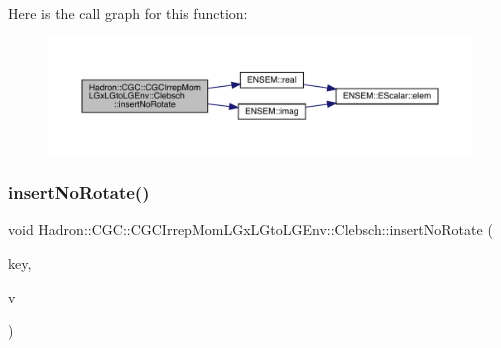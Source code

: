 Here is the call graph for this function\+:
\nopagebreak
\begin{figure}[H]
\begin{center}
\leavevmode
\includegraphics[width=350pt]{d1/d39/classHadron_1_1CGC_1_1CGCIrrepMomLGxLGtoLGEnv_1_1Clebsch_a57c67efaf6fb826157a5c19a4066959e_cgraph}
\end{center}
\end{figure}
\mbox{\label{classHadron_1_1CGC_1_1CGCIrrepMomLGxLGtoLGEnv_1_1Clebsch_a57c67efaf6fb826157a5c19a4066959e}} 
\subsubsection{\texorpdfstring{insertNoRotate()}{insertNoRotate()}\hspace{0.1cm}{\footnotesize\ttfamily [2/2]}}
{\footnotesize\ttfamily void Hadron\+::\+C\+G\+C\+::\+C\+G\+C\+Irrep\+Mom\+L\+Gx\+L\+Gto\+L\+G\+Env\+::\+Clebsch\+::insert\+No\+Rotate (\begin{DoxyParamCaption}\item[{const \mbox{\hyperlink{structHadron_1_1CGCKeyType}{C\+G\+C\+Key\+Type}}$<$ \mbox{\hyperlink{structHadron_1_1KeyCGCIrrepMom__t}{Key\+C\+G\+C\+Irrep\+Mom\+\_\+t}} $>$ \&}]{key,  }\item[{\mbox{\hyperlink{namespaceHadron_1_1CGC_a52d2b70e6792726fb525eab94daae53b}{cdouble}}}]{v }\end{DoxyParamCaption})\hspace{0.3cm}{\ttfamily [inline]}}

